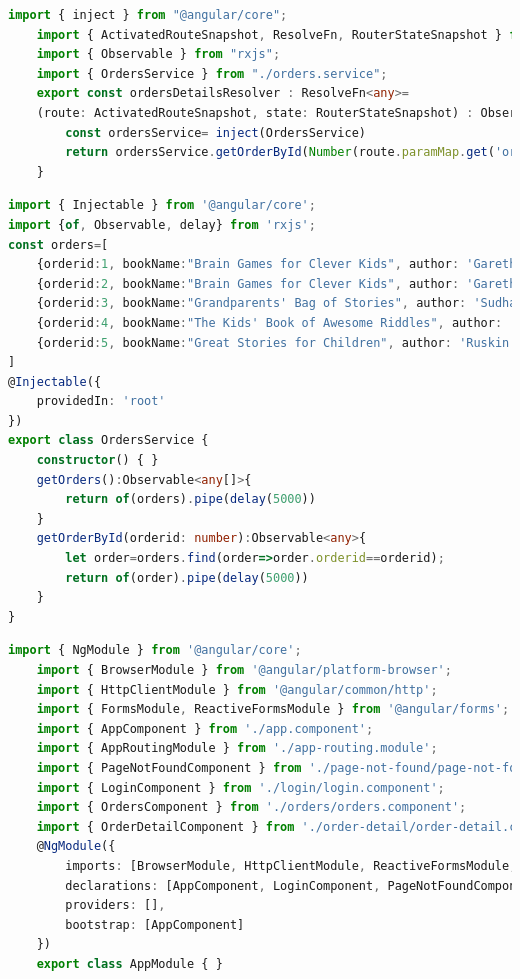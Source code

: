 \documentclass{report}
\begin{document}
\begin{lstlisting}[caption=order-detail-resolver.ts, language=Typescript]
	import { inject } from "@angular/core";
	import { ActivatedRouteSnapshot, ResolveFn, RouterStateSnapshot } from "@angular/router";
	import { Observable } from "rxjs";
	import { OrdersService } from "./orders.service";
	export const ordersDetailsResolver : ResolveFn<any>= 
	(route: ActivatedRouteSnapshot, state: RouterStateSnapshot) : Observable<any> => {
		const ordersService= inject(OrdersService)
		return ordersService.getOrderById(Number(route.paramMap.get('orderid')));
	} 
\end{lstlisting}


\begin{lstlisting}[caption=orders.service.ts, language=Typescript]
	import { Injectable } from '@angular/core';
import {of, Observable, delay} from 'rxjs';
const orders=[
	{orderid:1, bookName:"Brain Games for Clever Kids", author: 'Gareth Moore', publisher: 'Buster Books', price: 5.99, quantity: 1, total: 5.99},
	{orderid:2, bookName:"Brain Games for Clever Kids", author: 'Gareth Moore', publisher: 'Buster Books', price: 5.99, quantity: 1, total: 5.99},
	{orderid:3, bookName:"Grandparents' Bag of Stories", author: 'Sudha Murty', publisher: 'Penguin Random House', price: 5.99, quantity: 1, total: 5.99},
	{orderid:4, bookName:"The Kids' Book of Awesome Riddles", author: 'Helen Rosenberg', publisher: 'Rockridge Press', price: 5.99, quantity: 1, total: 5.99},
	{orderid:5, bookName:"Great Stories for Children", author: 'Ruskin Bond', publisher: 'Rupa Publications', price: 5.99, quantity: 1, total: 5.99},
]
@Injectable({
	providedIn: 'root'
})
export class OrdersService {
	constructor() { }
	getOrders():Observable<any[]>{
		return of(orders).pipe(delay(5000))
	}
	getOrderById(orderid: number):Observable<any>{
		let order=orders.find(order=>order.orderid==orderid);
		return of(order).pipe(delay(5000))
	} 
}

\end{lstlisting}


\begin{lstlisting}[caption=app.module.ts, language=Typescript]
	import { NgModule } from '@angular/core';
	import { BrowserModule } from '@angular/platform-browser';
	import { HttpClientModule } from '@angular/common/http';
	import { FormsModule, ReactiveFormsModule } from '@angular/forms';
	import { AppComponent } from './app.component';
	import { AppRoutingModule } from './app-routing.module';
	import { PageNotFoundComponent } from './page-not-found/page-not-found.component';
	import { LoginComponent } from './login/login.component';
	import { OrdersComponent } from './orders/orders.component';
	import { OrderDetailComponent } from './order-detail/order-detail.component';
	@NgModule({
		imports: [BrowserModule, HttpClientModule, ReactiveFormsModule,FormsModule, AppRoutingModule],
		declarations: [AppComponent, LoginComponent, PageNotFoundComponent, OrdersComponent, OrderDetailComponent],
		providers: [],
		bootstrap: [AppComponent]
	})
	export class AppModule { }
\end{lstlisting}
\end{document}
